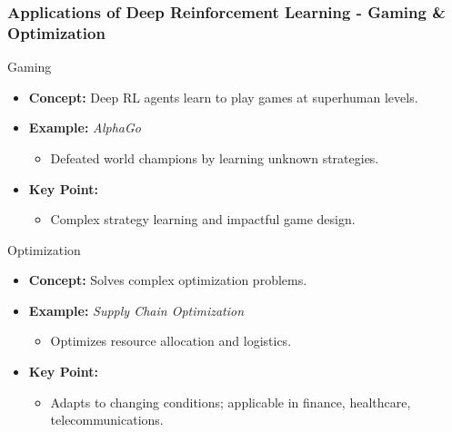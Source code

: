 \documentclass[aspectratio=169]{beamer}
\begin{document}
\begin{frame}[fragile]
  \frametitle{Applications of Deep Reinforcement Learning - Gaming & Optimization}
  \begin{block}{Gaming}
    \begin{itemize}
      \item \textbf{Concept:} Deep RL agents learn to play games at superhuman levels.
      \item \textbf{Example:} \textit{AlphaGo}
        \begin{itemize}
          \item Defeated world champions by learning unknown strategies.
        \end{itemize}
      \item \textbf{Key Point:}
        \begin{itemize}
          \item Complex strategy learning and impactful game design.
        \end{itemize}
    \end{itemize}
  \end{block}
  
  \begin{block}{Optimization}
    \begin{itemize}
      \item \textbf{Concept:} Solves complex optimization problems.
      \item \textbf{Example:} \textit{Supply Chain Optimization}
        \begin{itemize}
          \item Optimizes resource allocation and logistics.
        \end{itemize}
      \item \textbf{Key Point:}
        \begin{itemize}
          \item Adapts to changing conditions; applicable in finance, healthcare, telecommunications.
        \end{itemize}
    \end{itemize}
  \end{block}
\end{frame}
\end{document}
